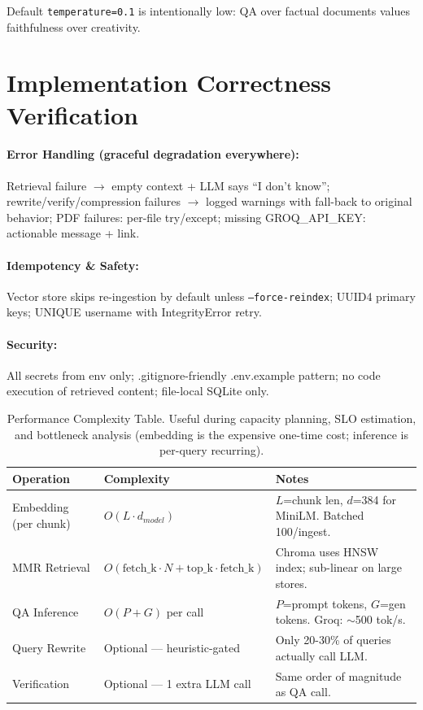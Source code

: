\documentclass[12pt,a4paper]{article}
\begin{document}
\noindent Default \texttt{temperature=0.1} is intentionally low: QA over factual documents values faithfulness over creativity.

\section{Implementation Correctness Verification}

\paragraph{Error Handling (graceful degradation everywhere):} Retrieval failure $\to$ empty context + LLM says ``I don't know''; rewrite/verify/compression failures $\to$ logged warnings with fall-back to original behavior; PDF failures: per-file try/except; missing GROQ\_API\_KEY: actionable message + link.

\paragraph{Idempotency \& Safety:} Vector store skips re-ingestion by default unless \texttt{--force-reindex}; UUID4 primary keys; UNIQUE username with IntegrityError retry.

\paragraph{Security:} All secrets from env only; .gitignore-friendly .env.example pattern; no code execution of retrieved content; file-local SQLite only.

\newpage

\begin{table}[H]
\centering
\footnotesize
\begin{tabular}{@{}llp{7.5cm}@{}}
\toprule
\textbf{Operation} & \textbf{Complexity} & \textbf{Notes} \\
\midrule
Embedding (per chunk) & $O(L \cdot d_{model})$ & $L$=chunk len, $d$=384 for MiniLM. Batched 100/ingest. \\
MMR Retrieval & $O(\text{fetch\_k} \cdot N + \text{top\_k} \cdot \text{fetch\_k})$ & Chroma uses HNSW index; sub-linear on large stores. \\
QA Inference & $O(P + G)$ per call & $P$=prompt tokens, $G$=gen tokens. Groq: $\sim$500 tok/s. \\
Query Rewrite & Optional — heuristic-gated & Only 20-30\% of queries actually call LLM. \\
Verification & Optional — 1 extra LLM call & Same order of magnitude as QA call. \\
\bottomrule
\end{tabular}
\caption{Performance Complexity Table. Useful during capacity planning, SLO estimation, and bottleneck analysis (embedding is the expensive one-time cost; inference is per-query recurring).}
\label{tab:complexity}
\end{table}
\end{document}
